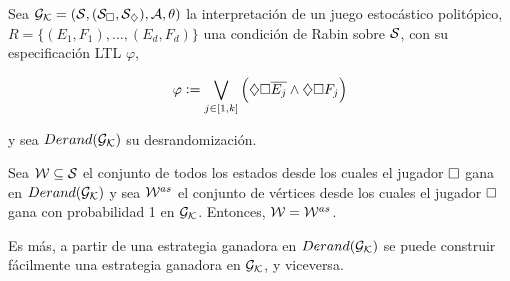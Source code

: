 \begin{theorem}
	\label{teocuali}
	Sea $\mathcal{G}_{\mathcal{K}} = (\mathcal{S}, (\mathcal{S}_\square, \mathcal{S}_\diamondsuit), \mathcal{A}, \theta)$ la interpretación de un juego estocástico politópico, $R = \{(E_1, F_1), \dots, (E_d, F_d)\}$ una condición de Rabin sobre $\mathcal{S}$, con su especificación LTL $\varphi$,

	$$
		\varphi := \bigvee_{j \in [1, k]} \left( \diamondsuit \square \overline{E_j} \wedge \diamondsuit \square F_j \right)
	$$

	y sea $Derand(\mathcal{G}_{\mathcal{K}})$ su desrandomización.

	Sea $\mathcal{W} \subseteq \mathcal{S}$ el conjunto de todos los estados desde los cuales el
	jugador $\square$ gana en $Derand(\mathcal{G}_{\mathcal{K}})$ y sea $\mathcal{W}^{as}$ el conjunto de vértices desde
	los cuales el jugador $\square$ gana con probabilidad 1 en $\mathcal{G}_{\mathcal{K}}$. Entonces, $\mathcal{W} =
		\mathcal{W}^{as}$.

	Es más, a partir de una estrategia ganadora en $Derand(\mathcal{G}_{\mathcal{K}})$ se puede construir
	fácilmente una estrategia ganadora en $\mathcal{G}_{\mathcal{K}}$, y viceversa.
\end{theorem}

